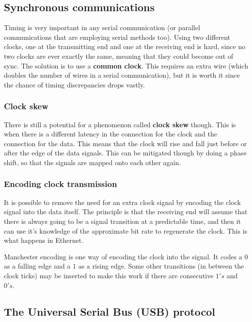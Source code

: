 \subsection{Synchronous communications}

Timing is very important in any serial communication (or parallel communications
that are employing serial methods too). Using two different clocks, one at the
transmitting end and one at the receiving end is hard, since no two clocks are
ever exactly the same, meaning that they could become out of sync. The solution
is to use a {\bf common clock}. This requires an extra wire (which doubles the
number of wires in a serial communication), but it is worth it since the chance
of timing discrepancies drops vastly.

\subsubsection{Clock skew}

There is still a potential for a phenomenon called {\bf clock skew} though. This
is when there is a different latency in the connection for the clock and the
connection for the data. This means that the clock will rise and fall just
before or after the edge of the data signals. This can be mitigated though by
doing a phase shift, so that the signals are mapped onto each other again.

\subsubsection{Encoding clock transmission}

It is possible to remove the need for an extra clock signal by encoding the
clock signal into the data itself. The principle is that the receiving end will
assume that there is always going to be a signal transition at a predictable
time, and then it can use it's knowledge of the approximate bit rate to
regenerate the clock. This is what happens in Ethernet.


Manchester encoding is one way of encoding the clock into the signal. It codes a
$0$ as a falling edge and a $1$ as a rising edge. Some other transitions
(in between the clock ticks) may be inserted to make this work if there are
consecutive $1's$ and $0's$.

\subsection{The Universal Serial Bus (USB) protocol}


